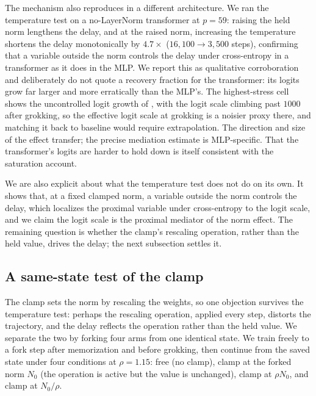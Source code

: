 The mechanism also reproduces in a different architecture. We ran the temperature test on a no-LayerNorm
transformer at $p=59$: raising the held norm lengthens the delay, and at the raised norm, increasing the
temperature shortens the delay monotonically by $4.7\times$ ($16{,}100\to3{,}500$ steps), confirming that a
variable outside the norm controls the delay under cross-entropy in a transformer as it does in the MLP. We
report this as qualitative corroboration and deliberately do not quote a recovery fraction for the
transformer: its logits grow far larger and more erratically than the MLP's. The highest-stress cell
shows the uncontrolled logit growth of \citet{prieto2025grokking}, with the logit scale climbing past
$1000$ after grokking, so the effective logit scale at grokking is a noisier proxy there, and matching it
back to baseline would require extrapolation. The direction and size of the effect transfer; the precise
mediation estimate is MLP-specific. That the transformer's logits are harder to hold down is itself
consistent with the saturation account.

We are also explicit about what the temperature test does not do on its own. It shows that, at a fixed
clamped norm, a variable outside the norm controls the delay, which localizes the proximal variable under
cross-entropy to the logit scale, and we claim the logit scale is the proximal mediator of the norm effect.
The remaining question is whether the clamp's rescaling operation, rather than the held value, drives the
delay; the next subsection settles it.

\subsection{A same-state test of the clamp}\label{sec:samestate}

The clamp sets the norm by rescaling the weights, so one objection survives the temperature test: perhaps
the rescaling operation, applied every step, distorts the trajectory, and the delay reflects the operation
rather than the held value. We separate the two by forking four arms from one identical state. We train
freely to a fork step after memorization and before grokking, then continue from the saved state under four
conditions at $\rho=1.15$: free (no clamp), clamp at the forked norm $N_0$ (the operation is active but the
value is unchanged), clamp at $\rho N_0$, and clamp at $N_0/\rho$.

